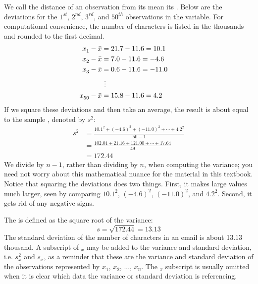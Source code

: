 We call the distance of an observation from its mean its . Below are the deviations for the $1^{st}_{}$, $2^{nd}_{}$, $3^{rd}$, and $50^{th}_{}$ observations in the  variable. For computational convenience, the number of characters is listed in the thousands and rounded to the first decimal.
\begin{align*}
x_1^{}-\bar{x} &= 21.7 - 11.6 = 10.1 \hspace{5mm}\text{ } \\
x_2^{}-\bar{x} &= 7.0 - 11.6 = -4.6 \\
x_3^{}-\bar{x} &= 0.6 - 11.6 = -11.0 \\
			&\ \vdots \\
x_{50}^{}-\bar{x} &= 15.8 - 11.6 = 4.2
\end{align*}
If we square these deviations and then take an average, the result is about equal to the sample \label{varianceIsDefined}, denoted by $s_{}^2$:
\begin{align*}
s_{}^2 &= \frac{10.1_{}^2 + (-4.6)_{}^2 + (-11.0)_{}^2 + \cdots + 4.2_{}^2}{50-1} \\
	&= \frac{102.01 + 21.16 + 121.00 + \cdots + 17.64}{49} \\
	&= 172.44
\end{align*}
We divide by $n-1$, rather than dividing by $n$, when computing the variance; you need not worry about this mathematical nuance for the material in this textbook. Notice that squaring the deviations does two things. First, it makes large values much larger, seen by comparing $10.1^2$, $(-4.6)^2$, $(-11.0)^2$, and $4.2^2$. Second, it gets rid of any negative signs.

The  is defined as the square root of the variance:
$$s=\sqrt{172.44} = 13.13$$
The standard deviation of the number of characters in an email is about 13.13 thousand. A subscript of $_x$ may be added to the variance and standard deviation, i.e. $s_x^2$ and $s_x^{}$, as a reminder that these are the variance and standard deviation of the observations represented by $x_1^{}$, $x_2^{}$, ..., $x_n^{}$. The $_{x}$ subscript is usually omitted when it is clear which data the variance or standard deviation is referencing.

